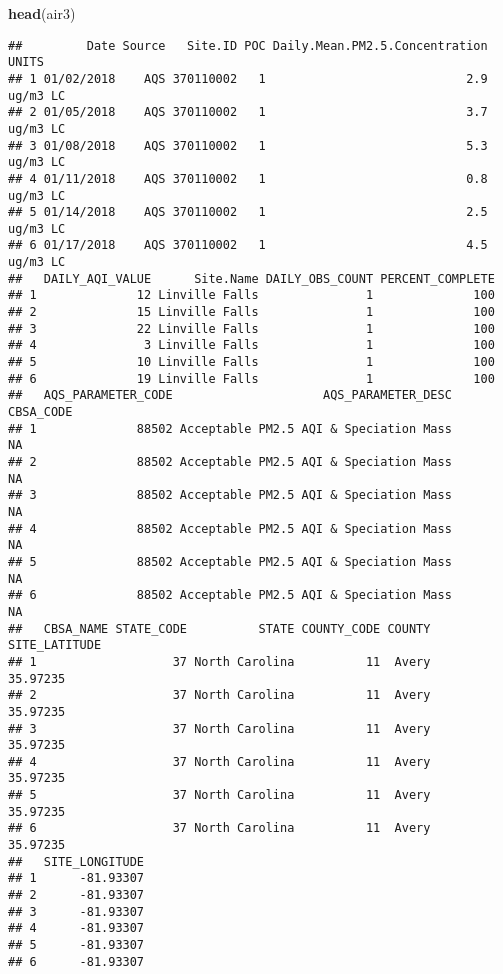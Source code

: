 \documentclass[]{article}
\newenvironment{Shaded}{\begin{snugshade}}{\end{snugshade}}
\newcommand{\KeywordTok}[1]{\textcolor[rgb]{0.13,0.29,0.53}{\textbf{#1}}}
\newcommand{\NormalTok}[1]{#1}
\begin{document}
\begin{Shaded}
\begin{Highlighting}[]
\KeywordTok{head}\NormalTok{(air3)}
\end{Highlighting}
\end{Shaded}

\begin{verbatim}
##         Date Source   Site.ID POC Daily.Mean.PM2.5.Concentration    UNITS
## 1 01/02/2018    AQS 370110002   1                            2.9 ug/m3 LC
## 2 01/05/2018    AQS 370110002   1                            3.7 ug/m3 LC
## 3 01/08/2018    AQS 370110002   1                            5.3 ug/m3 LC
## 4 01/11/2018    AQS 370110002   1                            0.8 ug/m3 LC
## 5 01/14/2018    AQS 370110002   1                            2.5 ug/m3 LC
## 6 01/17/2018    AQS 370110002   1                            4.5 ug/m3 LC
##   DAILY_AQI_VALUE      Site.Name DAILY_OBS_COUNT PERCENT_COMPLETE
## 1              12 Linville Falls               1              100
## 2              15 Linville Falls               1              100
## 3              22 Linville Falls               1              100
## 4               3 Linville Falls               1              100
## 5              10 Linville Falls               1              100
## 6              19 Linville Falls               1              100
##   AQS_PARAMETER_CODE                     AQS_PARAMETER_DESC CBSA_CODE
## 1              88502 Acceptable PM2.5 AQI & Speciation Mass        NA
## 2              88502 Acceptable PM2.5 AQI & Speciation Mass        NA
## 3              88502 Acceptable PM2.5 AQI & Speciation Mass        NA
## 4              88502 Acceptable PM2.5 AQI & Speciation Mass        NA
## 5              88502 Acceptable PM2.5 AQI & Speciation Mass        NA
## 6              88502 Acceptable PM2.5 AQI & Speciation Mass        NA
##   CBSA_NAME STATE_CODE          STATE COUNTY_CODE COUNTY SITE_LATITUDE
## 1                   37 North Carolina          11  Avery      35.97235
## 2                   37 North Carolina          11  Avery      35.97235
## 3                   37 North Carolina          11  Avery      35.97235
## 4                   37 North Carolina          11  Avery      35.97235
## 5                   37 North Carolina          11  Avery      35.97235
## 6                   37 North Carolina          11  Avery      35.97235
##   SITE_LONGITUDE
## 1      -81.93307
## 2      -81.93307
## 3      -81.93307
## 4      -81.93307
## 5      -81.93307
## 6      -81.93307
\end{verbatim}
\end{document}
